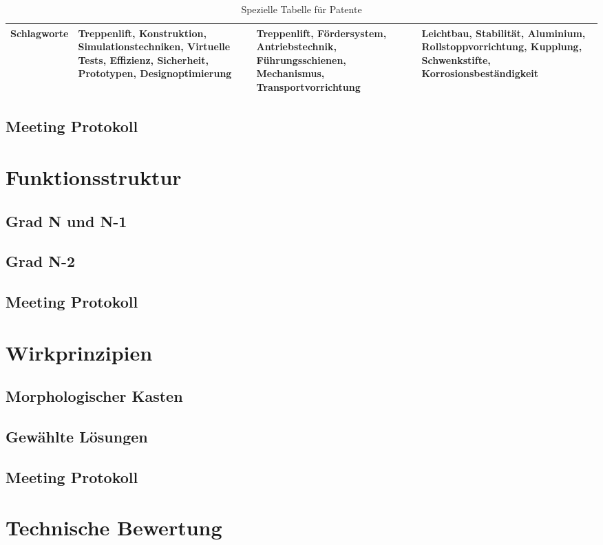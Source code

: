 \documentclass[10pt,a4paper]{article}
\begin{document}
\begin{table}[h!]
\begin{adjustbox}{max width=\textwidth}
\begin{tabular}{>{\raggedright\arraybackslash}m{3cm} >{\raggedright\arraybackslash}m{3.5cm} >{\raggedright\arraybackslash}m{3.5cm} >{\raggedright\arraybackslash}m{3.5cm}}
        \midrule
        \textbf{Schlagworte} & Treppenlift, Konstruktion, Simulationstechniken, Virtuelle Tests, Effizienz, Sicherheit, Prototypen, Designoptimierung & Treppenlift, Fördersystem, Antriebstechnik, Führungsschienen, Mechanismus, Transportvorrichtung & Leichtbau, Stabilität, Aluminium, Rollstoppvorrichtung, Kupplung, Schwenkstifte, Korrosionsbeständigkeit \\
        \bottomrule
        \bottomrule
    \end{tabular}
    \end{adjustbox}
    \caption{Spezielle Tabelle für Patente}
    \label{tab:special_table}
\end{table}

\subsection{Meeting Protokoll}
\section{Funktionsstruktur}
\subsection{Grad N und N-1}
\subsection{Grad N-2}
\subsection{Meeting Protokoll}
\section{Wirkprinzipien}
\subsection{Morphologischer Kasten}
\subsection{Gewählte Lösungen}
\subsection{Meeting Protokoll}
\newpage
\section{Technische Bewertung}
\end{document}
